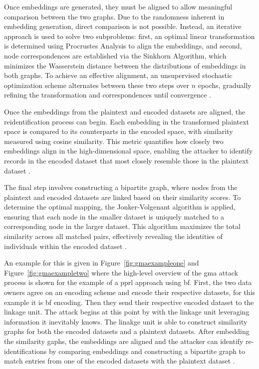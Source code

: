 Once embeddings are generated, they must be aligned to allow meaningful comparison between the two graphs.
Due to the randomness inherent in embedding generation, direct comparison is not possible.
Instead, an iterative approach is used to solve two subproblems: first, an optimal linear transformation is determined using Procrustes Analysis to align the embeddings, and second, node correspondences are established via the Sinkhorn Algorithm, which minimizes the Wasserstein distance between the distributions of embeddings in both graphs.
To achieve an effective alignment, an unsupervised stochastic optimization scheme alternates between these two steps over \(n\) epochs, gradually refining the transformation and correspondences until convergence \cite{schaefer2024}.

Once the embeddings from the plaintext and encoded datasets are aligned, the reidentification process can begin.
Each embedding in the transformed plaintext space is compared to its counterparts in the encoded space, with similarity measured using cosine similarity.
This metric quantifies how closely two embeddings align in the high-dimensional space, enabling the attacker to identify records in the encoded dataset that most closely resemble those in the plaintext dataset \cite{schaefer2024}.

The final step involves constructing a bipartite graph, where nodes from the plaintext and encoded datasets are linked based on their similarity scores.
To determine the optimal mapping, the Jonker-Volgenant algorithm is applied, ensuring that each node in the smaller dataset is uniquely matched to a corresponding node in the larger dataset.
This algorithm maximizes the total similarity across all matched pairs, effectively revealing the identities of individuals within the encoded dataset \cite{schaefer2024}.

An example for this is given in Figure~\ref{fig:gmaexampleone} and Figure~\ref{fig:gmaexampletwo} where the high-level overview of the \ac{gma} attack process is shown for the example of a \ac{pprl} approach using \ac{bf}.
First, the two data owners agree on an encoding scheme and encode their respective datasets, for this example it is \ac{bf} encoding.
Then they send their respective encoded dataset to the linkage unit.
The attack begins at this point by with the linkage unit leveraging information it inevitably knows.
The linakge unit is able to construct similarity graphs for both the encoded datasets and a plaintext datasets.
After embedding the similarity gaphs, the embeddings are aligned and the attacker can identify re-identifications by comparing embeddings and constructing a bipartite graph to match entries from one of the encoded datasets with the plaintext dataset \cite{schaefer2024}.

